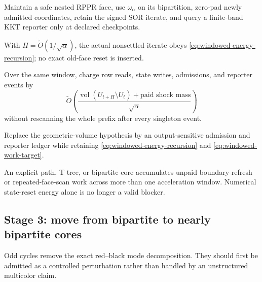 \begin{description}[leftmargin=2.7cm,style=nextline]
\item[Algorithm candidate]
Maintain a safe nested RPPR face, use $\omega_\alpha$ on its bipartition,
zero-pad newly admitted coordinates, retain the signed SOR iterate, and query
a finite-band KKT reporter only at declared checkpoints.
\item[Proved window]
With $H=\widetilde O(1/\sqrt\alpha)$, the actual nonsettled iterate obeys
\eqref{eq:windowed-energy-recursion}; no exact old-face reset is inserted.
\item[Work obligation]
Over the same window, charge row reads, state writes, admissions, and reporter
events by
\begin{equation}
 \widetilde O\!\left(
  \frac{\operatorname{vol}(U_{t+H}\setminus U_t)
        +\text{paid shock mass}}
       {\sqrt\alpha}
 \right)
 \label{eq:windowed-work-target}
\end{equation}
without rescanning the whole prefix after every singleton event.
\item[Go condition]
Replace the geometric-volume hypothesis by an output-sensitive admission and
reporter ledger while retaining \eqref{eq:windowed-energy-recursion} and
\eqref{eq:windowed-work-target}.
\item[Stop condition]
An explicit path, T tree, or bipartite core accumulates unpaid
boundary-refresh or repeated-face-scan work across more than one acceleration
window.  Numerical state-reset energy alone is no longer a valid blocker.
\end{description}

\subsection{Stage 3: move from bipartite to nearly bipartite cores}

Odd cycles remove the exact red--black mode decomposition.  They should first
be admitted as a controlled perturbation rather than handled by an
unstructured multicolor claim.

